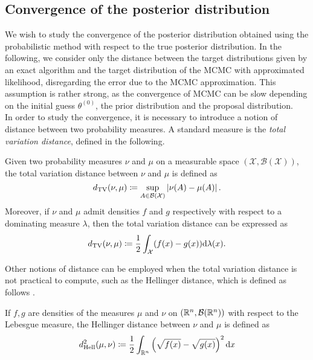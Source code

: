 \subsection{Convergence of the posterior distribution}\label{sec:PosteriorConvergence}

We wish to study the convergence of the posterior distribution obtained using the probabilistic method with respect to the true posterior distribution. In the following, we consider only the distance between the target distributions given by an exact algorithm and the target distribution of the MCMC with approximated likelihood, disregarding the error due to the MCMC approximation. This assumption is rather strong, as the convergence of MCMC can be slow depending on the initial guess $\theta^{(0)}$, the prior distribution and the proposal distribution. \\
In order to study the convergence, it is necessary to introduce a notion of distance between two probability measures. A standard measure is the \textit{total variation distance}, defined in the following.
\begin{definition} Given two probability measures $\nu$ and $\mu$ on a measurable space $(\mathcal{X}, \mathcal{B}(\mathcal{X}))$, the total variation distance between $\nu$ and $\mu$ is defined as
\begin{equation}
	d_{\mathrm{TV}}(\nu,\mu) \coloneqq \sup_{A\in \mathcal{B}(\mathcal{X})} \left|\nu(A) - \mu(A)\right|.
\end{equation}
Moreover, if $\nu$ and $\mu$ admit densities $f$ and $g$ respectively with respect to a dominating measure $\lambda$, then the total variation distance can be expressed as
\begin{equation}
	d_{\mathrm{TV}}(\nu,\mu) \coloneqq \frac{1}{2} \int_{\mathcal{X}} (f(x) - g(x))\dd \lambda(x).
\end{equation}
\end{definition}
\noindent Other notions of distance can be employed when the total variation distance is not practical to compute, such as the Hellinger distance, which is defined as follows \cite{GiS02}.
\begin{definition} If $f, g$ are densities of the measures $\mu$ and $\nu$ on $(\mathbb{R}^n, \mathcal{B}(\mathbb{R}^n))$ with respect to the Lebesgue measure, the Hellinger distance between $\nu$ and $\mu$ is defined as
\begin{equation}
	d_{\mathrm{Hell}}^2(\mu, \nu) \coloneqq \frac{1}{2}\int_{\mathbb{R}^n}\left(\sqrt{f(x)} - \sqrt{g(x)}\right)^2\dd x
\end{equation}
\end{definition}
